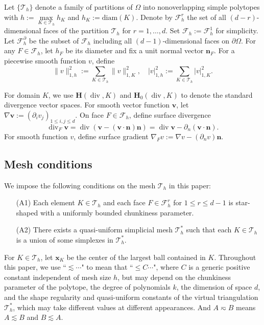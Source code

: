 \documentclass[10pt]{amsart}
\renewcommand{\div}{\operatorname{div}}
\numberwithin{equation}{section}
\begin{document}
Let $\{\mathcal {T}_h\}$ denote a family of partitions
of $\Omega$ into nonoverlapping simple polytopes with $h:=\max\limits_{K\in \mathcal {T}_h}h_K$
and $h_K:=\mbox{diam}(K)$.
Denote by $\mathcal F_h^r$ the set of all $(d-r)$-dimensional faces of the partition $\mathcal T_h$ for $r=1,\ldots,d$. Set $\mathcal F_h:=\mathcal F_h^1$ for simplicity. Let $\mathcal F_h^{\partial}$ be the subset of $\mathcal F_h$ including all $(d-1)$-dimensional faces on $\partial\Omega$. 
For any $F\in\mathcal{F}_h$,
let $h_F$ be its diameter and fix a unit normal vector $\boldsymbol{n}_F$.
For a piecewise smooth function $v$, define 
\[
\|v\|_{1,h}^2:=\sum_{K\in\mathcal T_h}\|v\|_{1,K}^2,\quad |v|_{1,h}^2:=\sum_{K\in\mathcal T_h}|v|_{1,K}^2.
\]

For domain $K$, we use $\boldsymbol{H}(\div, K)$ and $\boldsymbol{H}_0(\div, K)$ to denote the standard divergence vector spaces. 
For smooth vector function $\boldsymbol{v}$, let $\nabla\boldsymbol{v}:=(\partial_iv_j)_{1\leq i,j\leq d}$.
On face $F\in\mathcal F_h$, define surface divergence
\[
\div_F\boldsymbol{v}=\div(\boldsymbol{v}-(\boldsymbol{v}\cdot\boldsymbol{n})\boldsymbol{n})=\div\boldsymbol{v}-\partial_n(\boldsymbol{v}\cdot\boldsymbol{n}).
\]
For smooth function $v$, define surface gradient $\nabla_Fv:=\nabla v-(\partial_nv)\boldsymbol{n}$.



\subsection{Mesh conditions}
We impose the following conditions on the mesh $\mathcal T_h$ in this paper:
\begin{itemize}
 \item[(A1)] Each element $K\in \mathcal T_h$ and each face $F\in \mathcal F_h^r$ for $1\leq r\leq d-1$ is star-shaped with a uniformly bounded chunkiness parameter.

 \item[(A2)] There exists a quasi-uniform simplicial mesh $\mathcal T_h^*$ such that each $K\in \mathcal T_h$ is a union of some simplexes in $\mathcal T_h^*$.
\end{itemize}

For $K\in \mathcal T_h$, let $\boldsymbol{x}_K$ be the center of  the largest ball contained in $K$.
Throughout this paper, we use
``$\lesssim\cdots $" to mean that ``$\leq C\cdots$", where
$C$ is a generic positive constant independent of mesh size $h$, but may depend on the chunkiness parameter of the polytope, the degree of polynomials $k$, the dimension of space $d$, and the shape regularity and quasi-uniform constants of the virtual triangulation $\mathcal T^*_h$,
which may take different values at different appearances. And $A\eqsim B$ means $A\lesssim B$ and $B\lesssim A$.
\end{document}
